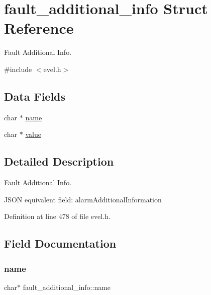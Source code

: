 \hypertarget{structfault__additional__info}{}\section{fault\+\_\+additional\+\_\+info Struct Reference}
\label{structfault__additional__info}


Fault Additional Info.  




{\ttfamily \#include $<$evel.\+h$>$}

\subsection*{Data Fields}
\begin{DoxyCompactItemize}
\item 
char $\ast$ \hyperlink{structfault__additional__info_af31e72ad2309cfb4a04e00a41daabfaa}{name}
\item 
char $\ast$ \hyperlink{structfault__additional__info_aed1daed022cd49c694feccc8635236c4}{value}
\end{DoxyCompactItemize}


\subsection{Detailed Description}
Fault Additional Info. 

J\+S\+ON equivalent field\+: alarm\+Additional\+Information 

Definition at line 478 of file evel.\+h.



\subsection{Field Documentation}
\hypertarget{structfault__additional__info_af31e72ad2309cfb4a04e00a41daabfaa}{}\label{structfault__additional__info_af31e72ad2309cfb4a04e00a41daabfaa} 
\subsubsection{\texorpdfstring{name}{name}}
{\footnotesize\ttfamily char$\ast$ fault\+\_\+additional\+\_\+info\+::name}



